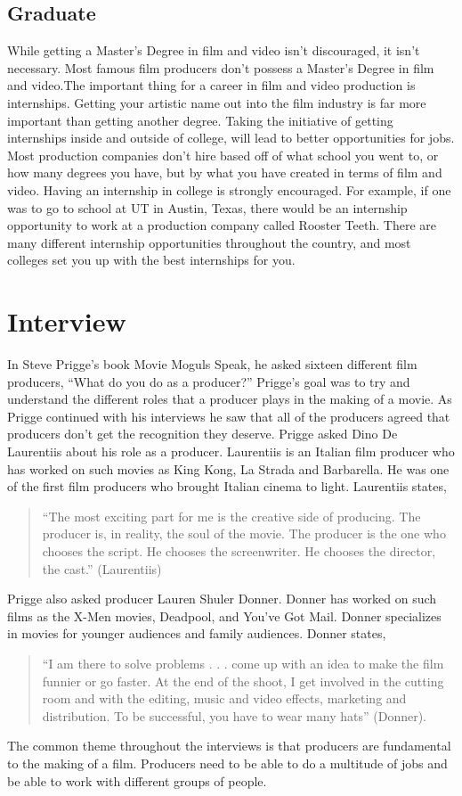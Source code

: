     \subsection{Graduate}
		While getting a Master’s Degree in film and video isn’t discouraged, it isn’t necessary. Most famous film producers don’t possess a Master's Degree in film and video.The important thing for a career in film and video production is internships. Getting your artistic name out into the film industry is far more important than getting another degree. Taking the initiative of getting internships inside and outside of college, will lead to better opportunities for jobs. Most production companies don’t hire based off of what school you went to, or how many degrees you have, but by what you have created in terms of film and video. Having an internship in college is strongly encouraged. For example, if one was to go to school at UT in Austin, Texas, there would be an internship opportunity to work at a production company called Rooster Teeth. There are many different internship opportunities throughout the country, and most colleges set you up with the best internships for you. 

\section{Interview}
	In Steve Prigge’s book Movie Moguls Speak, he asked sixteen different film producers, “What do you do as a producer?” Prigge’s goal was to try and understand the different roles that a producer plays in the making of a movie. As Prigge continued with his interviews he saw that all of the producers agreed that producers don’t get the recognition they deserve. 
	Prigge asked Dino De Laurentiis about his role as a producer. Laurentiis is an Italian film producer who has worked on such movies as King Kong, La Strada and Barbarella. He was one of the first film producers who brought Italian cinema to light. Laurentiis states, 
\begin{quote}
	“The most exciting part for me is the creative side of producing. The producer is, in reality, the soul of the movie. The producer is the one who chooses the script. He chooses the screenwriter. He chooses the director, the cast.” (Laurentiis) 
\end{quote}
	Prigge also asked producer Lauren Shuler Donner. Donner has worked on such films as the X-Men movies, Deadpool, and You’ve Got Mail. Donner specializes in movies for younger audiences and family audiences. Donner states,
\begin{quote}
	“I am there to solve problems . . . come up with an idea to make the film funnier or go faster. At the end of the shoot, I get involved in the cutting room and with the editing, music and video effects, marketing and distribution. To be successful, you have to wear many hats” (Donner).
\end{quote}
	The common theme throughout the interviews is that producers are fundamental to the making of a film. Producers need to be able to do a multitude of jobs and be able to work with different groups of people.

